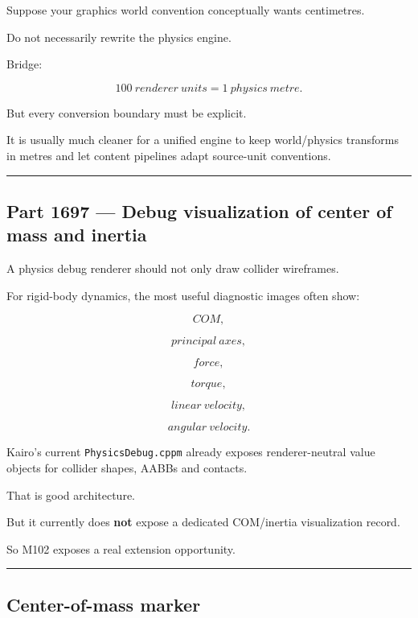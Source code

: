 Suppose your graphics world convention conceptually wants centimetres.

Do not necessarily rewrite the physics engine.

Bridge:

\[
100\ renderer\ units
=
1\ physics\ metre.
\]

But every conversion boundary must be explicit.

It is usually much cleaner for a unified engine to keep world/physics transforms in metres and let content pipelines adapt source-unit conventions.

\begin{center}\rule{0.5\linewidth}{0.5pt}\end{center}

\subsection{Part 1697 --- Debug visualization of center of mass and inertia}\label{06-engine-ii-ch039-part-1697-debug-visualization-of-center-of-mass-and-inertia}

A physics debug renderer should not only draw collider wireframes.

For rigid-body dynamics, the most useful diagnostic images often show:

\[
COM,
\]

\[
principal\ axes,
\]

\[
force,
\]

\[
torque,
\]

\[
linear\ velocity,
\]

\[
angular\ velocity.
\]

Kairo's current \texttt{PhysicsDebug.cppm} already exposes renderer-neutral value objects for collider shapes, AABBs and contacts.

That is good architecture.

But it currently does \textbf{not} expose a dedicated COM/inertia visualization record.

So M102 exposes a real extension opportunity.

\begin{center}\rule{0.5\linewidth}{0.5pt}\end{center}

\subsection{Center-of-mass marker}\label{06-engine-ii-ch039-center-of-mass-marker}

